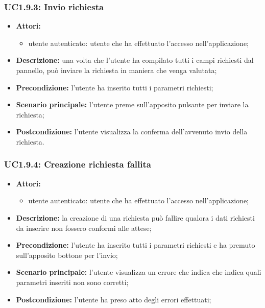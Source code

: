 \subsubsection{UC1.9.3: Invio richiesta}
\begin{itemize}
	\item \textbf{Attori:}
	\begin{itemize}
		\item utente autenticato: utente che ha effettuato l'accesso nell'applicazione;
	\end{itemize}
	\item \textbf{Descrizione:} una volta che l'utente ha compilato tutti i campi richiesti dal pannello, può inviare la richiesta in maniera che venga valutata;
	\item \textbf{Precondizione:} l'utente ha inserito tutti i parametri richiesti;
	\item \textbf{Scenario principale:} l'utente preme sull'apposito pulsante per inviare la richiesta;
	\item \textbf{Postcondizione:} l'utente visualizza la conferma dell'avvenuto invio della richiesta.
\end{itemize}

\subsubsection{UC1.9.4: Creazione richiesta fallita}
\begin{itemize}
	\item \textbf{Attori:}
	\begin{itemize}
		\item utente autenticato: utente che ha effettuato l'accesso nell'applicazione;
	\end{itemize}
	\item \textbf{Descrizione:} la creazione di una richiesta può fallire qualora i dati richiesti da inserire non fossero conformi alle attese;
	\item \textbf{Precondizione:} l'utente ha inserito tutti i parametri richiesti e ha premuto sull'apposito bottone per l'invio;
	\item \textbf{Scenario principale:} l'utente visualizza un errore che indica che indica quali parametri inseriti non sono corretti;
	\item \textbf{Postcondizione:} l'utente ha preso atto degli errori effettuati;
\end{itemize}

\pagebreak


